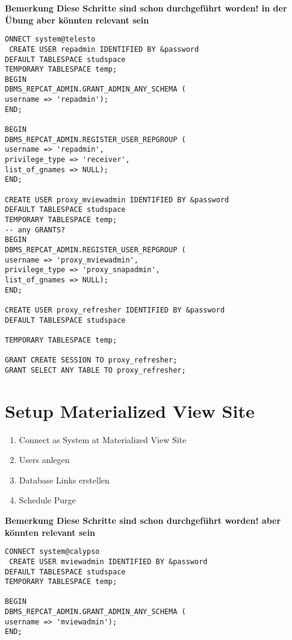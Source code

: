 \documentclass[a4paper,10pt,titlepage=false]{scrreprt}
\begin{document}
\begin{itemize}
\textbf{Bemerkung
Diese Schritte sind schon durchgeführt worden! in der Übung aber könnten relevant sein}

\begin{lstlisting}[style=sql,title=Master Site Setup]
  ONNECT system@telesto
 CREATE USER repadmin IDENTIFIED BY &password
DEFAULT TABLESPACE studspace
TEMPORARY TABLESPACE temp;
BEGIN
DBMS_REPCAT_ADMIN.GRANT_ADMIN_ANY_SCHEMA (
username => 'repadmin');
END;

BEGIN
DBMS_REPCAT_ADMIN.REGISTER_USER_REPGROUP (
username => 'repadmin',
privilege_type => 'receiver',
list_of_gnames => NULL);
END;

CREATE USER proxy_mviewadmin IDENTIFIED BY &password
DEFAULT TABLESPACE studspace
TEMPORARY TABLESPACE temp;
-- any GRANTS?
BEGIN
DBMS_REPCAT_ADMIN.REGISTER_USER_REPGROUP (
username => 'proxy_mviewadmin',
privilege_type => 'proxy_snapadmin',
list_of_gnames => NULL);
END;

CREATE USER proxy_refresher IDENTIFIED BY &password
DEFAULT TABLESPACE studspace

TEMPORARY TABLESPACE temp;

GRANT CREATE SESSION TO proxy_refresher;
GRANT SELECT ANY TABLE TO proxy_refresher;
\end{lstlisting}

\section{Setup Materialized View Site} %
\label{sec:setup_materialized_view_site}
\begin{enumerate}
  \item  Connect as System at Materialized View Site
\item Users anlegen
\item  Database Links erstellen
\item  Schedule Purge
\end{enumerate}

\textbf{Bemerkung
Diese Schritte sind schon durchgeführt worden! aber könnten relevant sein}


\begin{lstlisting}[caption=Setup Materilized View Site (Updateable),style=sql]
CONNECT system@calypso
 CREATE USER mviewadmin IDENTIFIED BY &password
DEFAULT TABLESPACE studspace
TEMPORARY TABLESPACE temp;

BEGIN
DBMS_REPCAT_ADMIN.GRANT_ADMIN_ANY_SCHEMA (
username => 'mviewadmin');
END;


\end{lstlisting}
\end{itemize}
\end{document}
